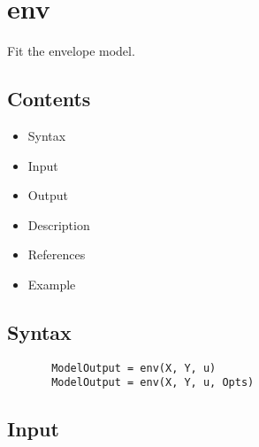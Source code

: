 \documentclass[a4paper,11pt,openany]{memoir}
\begin{document}
\newpage



\rmfamily
\color{black}\section{env}

\begin{par}
Fit the envelope model.
\end{par} \vspace{1em}

\subsection*{Contents}

\begin{itemize}
\setlength{\itemsep}{-1ex}
   \item Syntax
   \item Input
   \item Output
   \item Description
   \item References
   \item Example
\end{itemize}


\subsection*{Syntax}


\begin{verbatim}       ModelOutput = env(X, Y, u)
       ModelOutput = env(X, Y, u, Opts)\end{verbatim}
    

\subsection*{Input}
\end{document}
